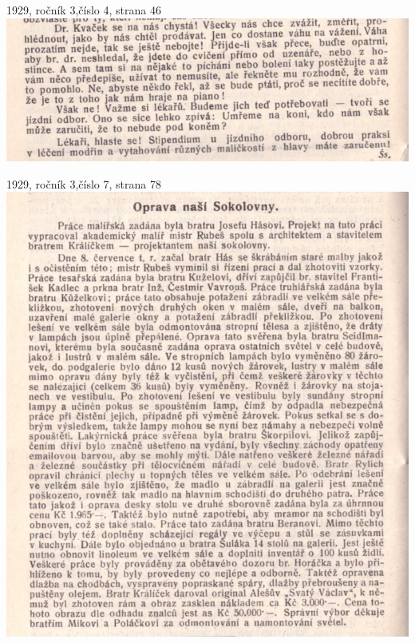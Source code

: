 \documentclass[11pt]{article}
\begin{document}
\vspace*{\baselineskip}
1929, ročník 3,číslo 4, strana 46 \\
\includegraphics[width=\imagewidth]{original/1929/Skener_20250318 (13).jpg}

1929, ročník 3,číslo 7, strana 78 \\
\includegraphics[width=\imagewidth]{original/1929/Skener_20250318 (14).jpg}
\end{document}
